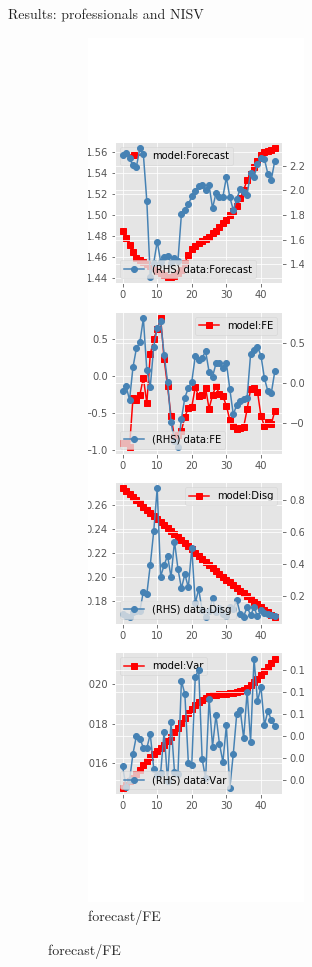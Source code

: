 \documentclass{beamer}
\begin{document}
\begin{frame}{Results: professionals and NISV}
\begin{figure}[ht]
\begin{subfigure}[b]{0.19\textwidth}
		\end{subfigure}
		\hfill
		\begin{subfigure}[b]{0.19\textwidth}
			\caption{forecast/FE}
			\includegraphics[width=\textwidth, height = 0.8\textheight]{figuresDraft/spf_ni_est_sv_diag2.png}

\end{subfigure}
\end{figure}
\end{frame}
\end{document}
